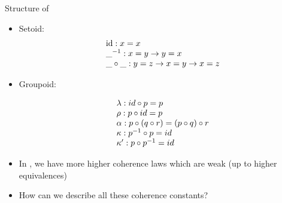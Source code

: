 \documentclass[12pt, mathserif,handout]{beamer}
\begin{document}
\begin{frame}[allowframebreaks,t]{Structure of \wog}

\begin{itemize}

\item Setoid: 
\begin{equation*}
\begin{array}[b]{l} 
\text{id} : x = x \\
\_^{-1} : x= y \to y  = x \\
\_ \circ\_ : y = z \to x = y \to x = z
 \end{array}
\end{equation*}

\item Groupoid: 

\begin{equation*}
\begin{array}[b]{l}
\lambda : id \circ p = p \\
\rho : p \circ id = p \\
\alpha : p \circ (q \circ r) = (p \circ q) \circ r \\
\kappa : p^{-1}\circ p = id \\
\kappa' : p \circ p^{-1} = id
 \end{array}
\end{equation*}
\item In \wog, we have more higher coherence laws which are weak (up
  to higher equivalences)
\item How can we describe all these coherence constants?
\end{itemize}

\end{frame}
\end{document}
